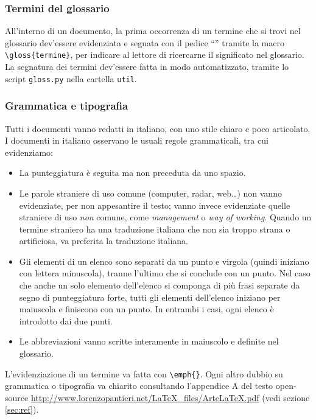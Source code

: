 \subsubsection{Termini del glossario} All'interno di un documento, la prima occorrenza di un termine che si trovi nel glossario dev'essere evidenziata e segnata con il pedice “” tramite la macro \texttt{\textbackslash gloss\{termine\}}, per indicare al lettore di ricercarne il significato nel glossario. La segnatura dei termini dev'essere fatta in modo automatizzato, tramite lo script \texttt{gloss.py} nella cartella \texttt{util}.

\subsubsection{Grammatica e tipografia} Tutti i documenti vanno redatti in italiano, con uno stile chiaro e poco articolato. I documenti in italiano osservano le usuali regole grammaticali, tra cui evidenziamo:
\begin{itemize}
	\item La punteggiatura è seguita ma non preceduta da uno spazio.
	\item Le parole straniere di uso comune (computer, radar, web\dots) non vanno evidenziate, per non appesantire il testo; vanno invece evidenziate quelle straniere di uso \emph{non} comune, come \emph{management} o \emph{way of working}. Quando un termine straniero ha una traduzione italiana che non sia troppo strana o artificiosa, va preferita la traduzione italiana.
	\item Gli elementi di un elenco sono separati da un punto e virgola (quindi iniziano con lettera minuscola), tranne l'ultimo che si conclude con un punto. Nel caso che anche un solo elemento dell'elenco si componga di più frasi separate da segno di punteggiatura forte, tutti gli elementi dell'elenco iniziano per maiuscola e finiscono con un punto. In entrambi i casi, ogni elenco è introdotto dai due punti.
	\item Le abbreviazioni vanno scritte interamente in maiuscolo e definite nel glossario.
\end{itemize}
L'evidenziazione di un termine va fatta con \texttt{\textbackslash emph\{\}}. Ogni altro dubbio su grammatica o tipografia va chiarito consultando l'appendice A del testo open-source \url{http://www.lorenzopantieri.net/LaTeX_files/ArteLaTeX.pdf} (vedi sezione \ref{sec:ref}).

